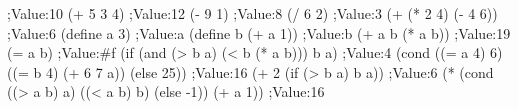 \begtt{}
;Value:10
(+ 5 3 4)
;Value:12
(- 9 1)
;Value:8
(/ 6 2)
;Value:3
(+ (* 2 4) (- 4 6))
;Value:6
(define a 3)
;Value:a
(define b (+ a 1))
;Value:b
(+ a b (* a b))
;Value:19
(= a b)
;Value:#f
(if (and (> b a) (< b (* a b)))
        b
        a)
;Value:4
(cond ((= a 4) 6)
          ((= b 4) (+ 6 7 a))
          (else 25))
;Value:16
(+ 2 (if (> b a) b a))
;Value:6
(* (cond ((> a b) a)
             ((< a b) b)
             (else -1))
       (+ a 1))
;Value:16
\endtt
